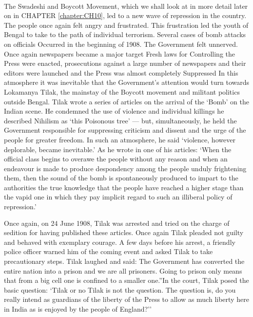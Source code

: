 \paragraph*{}
The Swadeshi and Boycott Movement, which we shall look at in more detail later on in CHAPTER \ref{chapter:CH10}, led to a new wave of repression in the country. The people once again felt angry and frustrated. This frustration led the youth of Bengal to take to the path of individual terrorism. Several cases of bomb attacks on officials Occurred in the beginning of 1908. The Government felt unnerved. Once again newspapers became a major target Fresh laws for Controlling the Press were enacted, prosecutions against a large number of newspapers and their editors were launched and the Press was almost completely Suppressed In this atmosphere it was inevitable that the Government's attention would turn towards Lokamanya Tilak, the mainstay of the Boycott movement and militant politics outside Bengal. Tilak wrote a series of articles on the arrival of the `Bomb' on the Indian scene. He condemned the use of violence and individual killings he described Nihilism as `this Poisonous tree' --- but, simultaneously, he held the Government responsible for suppressing criticism and dissent and the urge of the people for greater freedom. In such an atmosphere, he said `violence, however deplorable, became inevitable.' As he wrote in one of his articles: `When the official class begins to overawe the people without any reason and when an endeavour is made to produce despondency among the people unduly frightening them, then the sound of the bomb is spontaneously produced to impart to the authorities the true knowledge that the people have reached a higher stage than the vapid one in which they pay implicit regard to such an illiberal policy of repression.'

Once again, on 24 June 1908, Tilak was arrested and tried on the charge of sedition for having published these articles. Once again Tilak pleaded not guilty and behaved with exemplary courage. A few days before his arrest, a friendly police officer warned him of the coming event and asked Tilak to take precautionary steps. Tilak laughed and said: The Government has converted the entire nation into a prison and we are all prisoners. Going to prison only means that from a big cell one is confined to a smaller one.''In the court, Tilak posed the basic question: `Tilak or no Tilak is not the question. The question is, do you really intend as guardians of the liberty of the Press to allow as much liberty here in India as is enjoyed by the people of England?''

